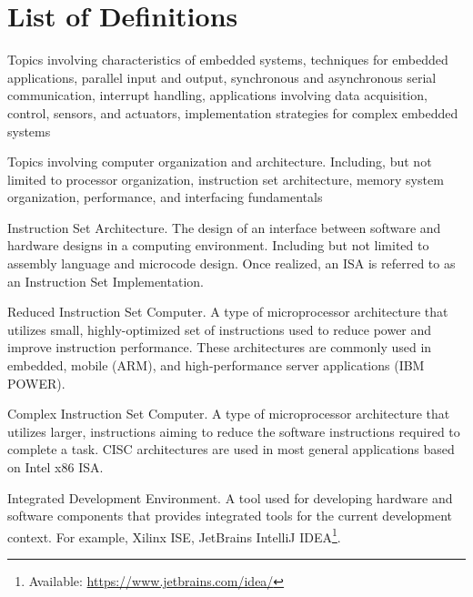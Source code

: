 
\chapter*{List of Definitions}

\begin{definition} 
	Topics involving characteristics of embedded systems, techniques for embedded applications, parallel input and output, synchronous and asynchronous serial communication, interrupt handling, applications involving data acquisition, control, sensors, and actuators, implementation strategies for complex embedded systems \cite[p.~118]{cec2016}
\end{definition}

\begin{definition} 
	Topics involving computer organization and architecture. Including, but not limited to processor organization, instruction set architecture, memory system organization, performance, and interfacing fundamentals\cite[p.~118]{cec2016}
\end{definition}

\begin{definition}[ISA]
    Instruction Set Architecture. The design of an interface between software and hardware designs in a computing environment. Including but not limited to assembly language and microcode design. Once realized, an ISA is referred to as an Instruction Set Implementation. 
\end{definition}

\begin{definition}[RISC]
    Reduced Instruction Set Computer. A type of microprocessor architecture that utilizes small, highly-optimized set of instructions used to reduce power and improve instruction performance\cite{Aletan1992, Stokes1999}. These architectures are commonly used in embedded, mobile (ARM), and high-performance server applications (IBM POWER). 
\end{definition}

\begin{definition}[CISC]
    Complex Instruction Set Computer. A type of microprocessor architecture that utilizes larger, instructions aiming to reduce the software instructions required to complete a task\cite{Aletan1992, Stokes1999}. CISC architectures are used in most general applications based on Intel\textregistered{} x86 ISA\cite{intel2017}.
\end{definition}

\begin{definition}[IDE]
    Integrated Development Environment. A tool used for developing hardware and software components that provides integrated tools for the current development context. For example, Xilinx ISE\cite{xilinxISE}, JetBrains IntelliJ IDEA\footnote{Available: \url{https://www.jetbrains.com/idea/}}.
\end{definition}